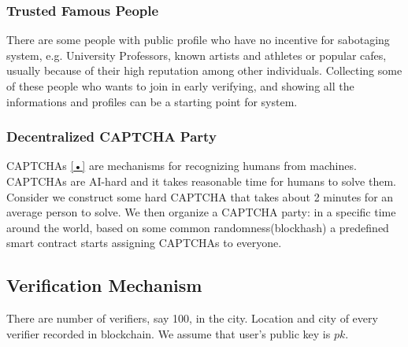 \documentclass{article}
\begin{document}
\subsubsection*{Trusted Famous People}
There are some people with public profile who have no incentive for sabotaging system, e.g. University Professors, known artists and athletes or popular cafes, usually because of their high reputation among other individuals. Collecting some of these people who wants to join in early verifying, and showing all the informations and profiles can be a starting point for system.

\subsubsection*{ Decentralized CAPTCHA Party}
CAPTCHAs {\ref{•}} are mechanisms for recognizing humans from machines. CAPTCHAs are AI-hard and it takes reasonable time for humans to solve them. Consider we construct some hard CAPTCHA that takes about 2 minutes for an average person to solve. We then organize a CAPTCHA party: in a specific time around the world, based on some common randomness(blockhash) a predefined smart contract starts assigning CAPTCHAs to everyone. 

\subsection{Verification Mechanism}
There are number of verifiers, say 100, in the city. Location and city of every verifier recorded in blockchain. We assume that user's public key is $pk$.
\\
\end{document}
